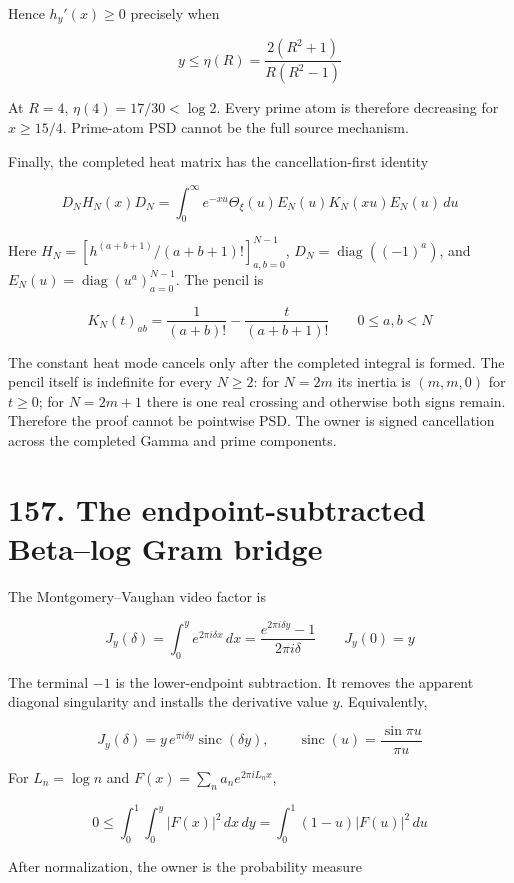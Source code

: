 \documentclass[
  11pt,
]{book}
\begin{document}
Hence \(h_y'(x)\ge0\) precisely when

\[
y\le\eta(R)
=\frac{2(R^2+1)}{R(R^2-1)}
\tag{103.10}
\]

At \(R=4\), \(\eta(4)=17/30<\log2\). Every prime atom is therefore
decreasing for \(x\ge15/4\). Prime-atom PSD cannot be the full source
mechanism.

Finally, the completed heat matrix has the cancellation-first identity

\[
D_NH_N(x)D_N
=\int_0^\infty e^{-xu}\Theta_\xi(u)
E_N(u)K_N(xu)E_N(u)\,du
\tag{103.11}
\]

Here \(H_N=[h^{(a+b+1)}/(a+b+1)!]_{a,b=0}^{N-1}\),
\(D_N=\operatorname{diag}((-1)^a)\), and
\(E_N(u)=\operatorname{diag}(u^a)_{a=0}^{N-1}\). The pencil is

\[
K_N(t)_{ab}
=\frac1{(a+b)!}-\frac{t}{(a+b+1)!}
\qquad 0\le a,b<N
\tag{103.12}
\]

The constant heat mode cancels only after the completed integral is
formed. The pencil itself is indefinite for every \(N\ge2\): for
\(N=2m\) its inertia is \((m,m,0)\) for \(t\ge0\); for \(N=2m+1\) there
is one real crossing and otherwise both signs remain. Therefore the
proof cannot be pointwise PSD. The owner is signed cancellation across
the completed Gamma and prime components.

\section{157. The endpoint-subtracted Beta--log Gram
bridge}\label{the-endpoint-subtracted-betalog-gram-bridge}

The Montgomery--Vaughan video factor is

\[
J_y(\delta)
=\int_0^y e^{2\pi i\delta x}\,dx
=\frac{e^{2\pi i\delta y}-1}{2\pi i\delta}
\qquad
J_y(0)=y
\tag{157.1}
\]

The terminal \(-1\) is the lower-endpoint subtraction. It removes the
apparent diagonal singularity and installs the derivative value \(y\).
Equivalently,

\[
\boxed{
J_y(\delta)=y\,e^{\pi i\delta y}\operatorname{sinc}(\delta y),\qquad
\operatorname{sinc}(u)=\frac{\sin\pi u}{\pi u}}
\tag{157.2}
\]

For \(L_n=\log n\) and \(F(x)=\sum_na_ne^{2\pi iL_nx}\),

\[
0\le\int_0^1\int_0^y|F(x)|^2\,dx\,dy
=\int_0^1(1-u)|F(u)|^2\,du
\tag{157.3}
\]

After normalization, the owner is the probability measure
\end{document}
